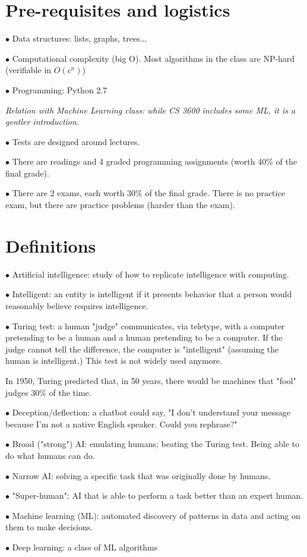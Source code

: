 \documentclass[english]{exam}
\begin{document}
    
    \section{Pre-requisites and logistics}
    
    $\bullet$ Data structures: lists, graphs, trees...
    
    $\bullet$ Computational complexity (big O). Most algorithms in the class are NP-hard (verifiable in $O(c^{n})$)
    
    $\bullet$ Programming: Python 2.7
    
    \textit{Relation with Machine Learning class: while CS 3600 includes some ML, it is a gentler introduction.}
    
    $\bullet$ Tests are designed around lectures.
    
    $\bullet$ There are readings and 4 graded programming assignments (worth 40\% of the final grade).
    
    $\bullet$ There are 2 exams, each worth 30\% of the final grade. There is no practice exam, but there are practice problems (harder than the exam).
    
    \section{Definitions}
    
    $\bullet$ Artificial intelligence: study of how to replicate intelligence with computing.
    
    $\bullet$ Intelligent: an entity is intelligent if it presents behavior that a person would reasonably believe requires intelligence.
    
    $\bullet$ Turing test: a human "judge" communicates, via teletype, with a computer pretending to be a human and a human pretending to be a computer. If the judge cannot tell the difference, the computer is "intelligent" (assuming the human is intelligent.) This test is not widely used anymore.

    In 1950, Turing predicted that, in 50 years, there would be machines that "fool" judges 30\% of the time.
    
    $\bullet$ Deception/deflection: a chatbot could say, "I don't understand your message because I'm not a native English speaker. Could you rephrase?"
    
    $\bullet$ Broad ("strong") AI: emulating humans; beating the Turing test. Being able to do what humans can do.
    
    $\bullet$ Narrow AI: solving a specific task that was originally done by humans.
    
    $\bullet$ "Super-human": AI that is able to perform a task better than an expert human.
    
    $\bullet$ Machine learning (ML): automated discovery of patterns in data and acting on them to make decisions.
    
    $\bullet$ Deep learning: a class of ML algorithms
\end{document}
